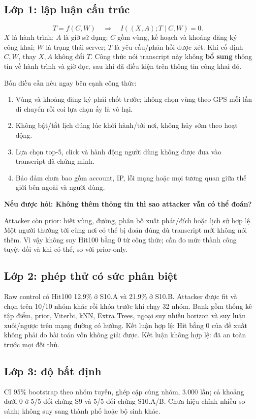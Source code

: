 \documentclass[10pt,a4paper]{article}
\newcommand{\ask}[2]{\par\textbf{Nếu được hỏi: #1}\par #2\par}
\begin{document}
\subsection*{Lớp 1: lập luận cấu trúc}
\[
T=f(C,W)\quad\Longrightarrow\quad I((X,A);T\mid C,W)=0.
\]
$X$ là hành trình; $A$ là giờ sử dụng; $C$ gồm vùng, kế hoạch và khoảng đăng ký công khai; $W$ là trạng thái server; $T$ là yêu cầu/phản hồi được xét. Khi cố định $C,W$, thay $X,A$ không đổi $T$. Công thức nói transcript này không \textbf{bổ sung} thông tin về hành trình và giờ đọc, sau khi đã điều kiện trên thông tin công khai đó.

Bốn điều cần nêu ngay bên cạnh công thức:
\begin{enumerate}
\item Vùng và khoảng đăng ký phải chốt trước; không chọn vùng theo GPS mỗi lần di chuyển rồi coi lựa chọn ấy là vô hại.
\item Không bật/tắt lịch đúng lúc khởi hành/tới nơi, không hủy sớm theo hoạt động.
\item Lựa chọn top-5, click và hành động người dùng không được đưa vào transcript đã chứng minh.
\item Bảo đảm chưa bao gồm account, IP, lỗi mạng hoặc mọi tương quan giữa thế giới bên ngoài và người dùng.
\end{enumerate}

\ask{Không thêm thông tin thì sao attacker vẫn có thể đoán?}{Attacker còn prior: biết vùng, đường, phân bố xuất phát/đích hoặc lịch sử hợp lệ. Một người thường tới cùng nơi có thể bị đoán đúng dù transcript mới không nói thêm. Vì vậy không suy Hit100 bằng 0 từ công thức; cần đo mức thành công tuyệt đối và khi có thể, so với prior-only.}

\subsection*{Lớp 2: phép thử có sức phân biệt}
Raw control có Hit100 12,9\% ở S10.A và 21,9\% ở S10.B. Attacker được fit và chọn trên 10/10 nhóm khác rồi khóa trước khi chạy 32 nhóm. Bank gồm thống kê tập điểm, prior, Viterbi, kNN, Extra Trees, ngoại suy nhiều horizon và suy luận xuôi/ngược trên mạng đường có hướng. Kết luận hợp lệ: Hit bằng 0 của đề xuất không phải do bài toán vốn không giải được. Kết luận không hợp lệ: đã an toàn trước mọi đối thủ.

\subsection*{Lớp 3: độ bất định}
CI 95\% bootstrap theo nhóm tuyến, ghép cặp cùng nhóm, 3.000 lần; cả khoảng dưới 0 ở 5/5 đối chứng S9 và 5/5 đối chứng S10.A/B. Chưa hiệu chỉnh nhiều so sánh; không suy sang thành phố hoặc bộ sinh khác.
\end{document}
